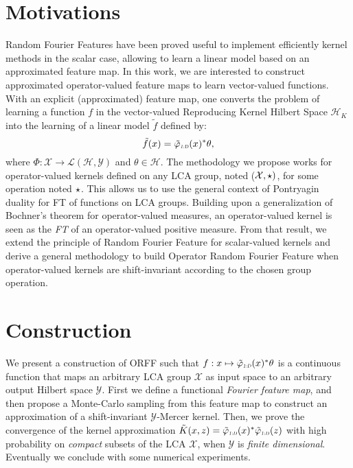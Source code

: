 \section{Motivations}
\label{sec:motivations}
Random Fourier Features have been proved useful to implement efficiently kernel methods in the scalar case, allowing to learn a linear model based on an approximated feature map. In this work, we are interested to construct approximated operator-valued feature maps to learn vector-valued functions. With an explicit (approximated) feature map, one converts the problem of learning a function $f$ in the vector-valued Reproducing Kernel Hilbert Space $\mathcal{H}_K$ into the learning of a linear model $\tilde{f}$ defined by:
 \begin{dmath*}
 \tilde{f}(x) = \tildePhi{1:D}(x)^* \theta,
 \end{dmath*}
 where $\Phi: \mathcal{X} \to \mathcal{L}(\mathcal{H},\mathcal{Y})$ and $\theta \in \mathcal{H}$. The methodology we propose works for operator-valued kernels defined on any \acf{LCA} group, noted ($\mathcal{X}, \star)$, for some operation noted $\star$. This allows us to use the general context of Pontryagin duality for \acl{FT} of functions on \acs{LCA} groups. Building upon a generalization of Bochner's theorem for operator-valued measures, an operator-valued kernel is seen as the \emph{\acl{FT}} of an operator-valued positive measure. From that result, we extend the principle of Random Fourier Feature for scalar-valued kernels and derive a general methodology to build Operator Random Fourier Feature when operator-valued kernels are shift-invariant according to the chosen group operation.

\section{Construction}
\label{sec:construction}
We present a construction of \acf{ORFF} such that $f: x\mapsto \tildePhi{1:D}(x)^*\theta$ is a continuous function that maps an arbitrary \acs{LCA} group $\mathcal{X}$ as input space to an arbitrary output Hilbert space $\mathcal{Y}$. First we define a functional \emph{Fourier feature map}, and then propose a Monte-Carlo sampling from this feature map to construct an approximation of a shift-invariant $\mathcal{Y}$-Mercer kernel.
Then, we prove the convergence of the kernel approximation $\tilde{K}(x,z)=\tildePhi{1:D}(x)^*\tildePhi{1:D}(z)$ with high probability on \emph{compact} subsets of the \acs{LCA} $\mathcal{X}$, when $\mathcal{Y}$ is \emph{finite dimensional}. Eventually we conclude with some numerical experiments.
